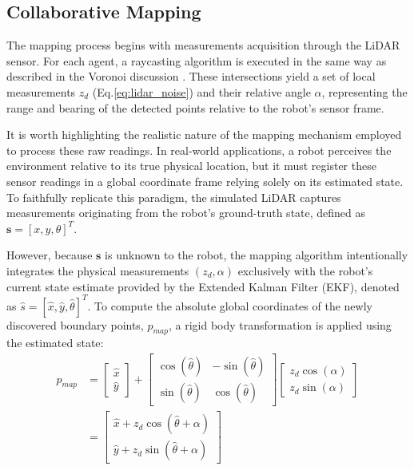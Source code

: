 \documentclass[times, twoside]{zHenriquesLab-StyleBioRxiv}
\begin{document}
\subsection{Collaborative Mapping}
The mapping process begins with measurements acquisition through the LiDAR sensor. For each agent, a raycasting algorithm is executed in the same way as described in the Voronoi discussion \cite{raycast}. These intersections yield a set of local measurements $z_d$ (Eq.\ref{eq:lidar_noise}) and their relative angle $ \alpha$, representing the range and bearing of the detected points relative to the robot's sensor frame.

It is worth highlighting the realistic nature of the mapping mechanism employed to process these raw readings. In real-world applications, a robot perceives the environment relative to its true physical location, but it must register these sensor readings in a global coordinate frame relying solely on its estimated state. To faithfully replicate this paradigm, the simulated LiDAR captures measurements originating from the robot's ground-truth state, defined as $\mathbf{s} = [x, y, \theta]^T$. 

However, because $\mathbf{s}$ is unknown to the robot, the mapping algorithm intentionally integrates the physical measurements $(z_d, \alpha)$ exclusively with the robot's current state estimate provided by the Extended Kalman Filter (EKF), denoted as $\hat{s} = [\hat{x}, \hat{y}, \hat{\theta}]^T$. To compute the absolute global coordinates of the newly discovered boundary points, $p_{map}$, a rigid body transformation is applied using the estimated state:
\begin{equation}\begin{split}
    p_{map} & = \begin{bmatrix} \hat{x} \\ \hat{y} \end{bmatrix} + \begin{bmatrix} \cos(\hat{\theta}) & -\sin(\hat{\theta}) \\ \sin(\hat{\theta}) & \cos(\hat{\theta}) \end{bmatrix} \begin{bmatrix} z_d \cos(\alpha) \\ z_d \sin(\alpha) \end{bmatrix}\\
    & = \begin{bmatrix} \hat{x} + z_d \cos(\hat{\theta} + \alpha) \\ \hat{y} + z_d \sin(\hat{\theta} + \alpha) \end{bmatrix}
\end{split}\end{equation}
\end{document}
